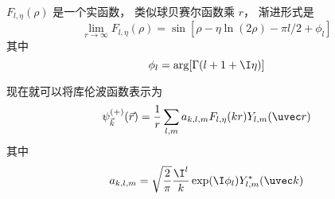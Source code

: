 $F_{l,\eta}(\rho)$ 是一个实函数， 类似球贝赛尔函数乘 $r$， 渐进形式是
\begin{equation}
\lim_{r\to \infty} F_{l,\eta}(\rho) = \sin[\rho - \eta\ln(2\rho) - \pi l/2 + \phi_l]
\end{equation}
其中
\begin{equation}
\phi_l = \arg[\Gamma(l+1+\I\eta)]
\end{equation}

现在就可以将库伦波函数表示为
\begin{equation}
\psi_{\vec k}^{(+)}(\vec r) = \frac{1}{r} \sum_{l,m} a_{k,l,m} F_{l,\eta}(kr) Y_{l,m}(\uvec r)
\end{equation}
其中
\begin{equation}
a_{k,l,m} = \sqrt{\frac{2}{\pi}} \frac{\I^l}{k} \exp(\I\phi_l) Y_{l,m}^* (\uvec k)
\end{equation}
